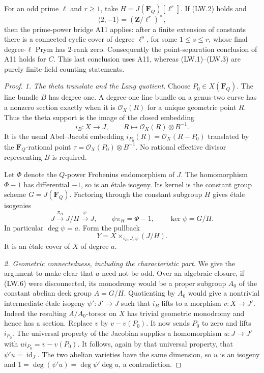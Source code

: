 \documentclass[11pt,a4paper]{article}
\begin{document}
For an odd prime $\ell$ and $r\ge1$, take
$H=J(\mathbf F_Q)[\ell^r]$.  If (LW.2) holds and
\[
             \langle 2,-1\rangle=(\mathbf Z/\ell^r)^\times,
 \tag{LW.4}
\]
then the prime-power bridge A11 applies: after a finite extension of
constants there is a connected cyclic cover of degree $\ell^s$,
for some $1\le s\le r$, whose final degree-$\ell$ Prym has $2$-rank zero.
Consequently the point-separation conclusion of A11 holds for $C$.
This last conclusion uses A11, whereas (LW.1)--(LW.3) are purely
finite-field counting statements.

\begin{proof}
\emph{1. The theta translate and the Lang quotient.}
Choose $P_0\in X(\mathbf F_Q)$.  The line bundle $B$ has degree one.
A degree-one line bundle on a genus-two curve has a nonzero section
exactly when it is $\mathcal O_X(R)$ for a unique geometric point $R$.
Thus the theta support is the image of the closed embedding
\[
 i_B:X\longrightarrow J,\qquad
 R\longmapsto\mathcal O_X(R)\otimes B^{-1}.
\]
It is the usual Abel--Jacobi embedding
$i_{P_0}(R)=\mathcal O_X(R-P_0)$ translated by the
$\mathbf F_Q$-rational point
$\tau=\mathcal O_X(P_0)\otimes B^{-1}$.
No rational effective divisor representing $B$ is required.

Let $\Phi$ denote the $Q$-power Frobenius endomorphism of $J$.
The homomorphism $\Phi-1$ has differential $-1$, so is an
\'etale isogeny.  Its kernel is the constant group scheme
$G=J(\mathbf F_Q)$.  Factoring through the constant subgroup $H$
gives \'etale isogenies
\[
  J\xrightarrow{\pi_H} J/H\xrightarrow{\psi}J,
  \qquad \psi\pi_H=\Phi-1,
  \qquad \ker\psi=G/H.
 \tag{LW.5}
\]
In particular $\deg\psi=a$.  Form the pullback
\[
                  Y=X\times_{i_B,J,\psi}(J/H).
 \tag{LW.6}
\]
It is an \'etale cover of $X$ of degree $a$.

\emph{2. Geometric connectedness, including the characteristic part.}
We give the argument to make clear that $a$ need not be odd.
Over an algebraic closure, if (LW.6) were disconnected, its
monodromy would be a proper subgroup $A_0$ of the constant abelian
deck group $A=G/H$.  Quotienting by $A_0$ would give a nontrivial
intermediate \'etale isogeny
$\psi':J'\to J$ such that $i_B$ lifts to a morphism $v:X\to J'$.
Indeed the resulting $A/A_0$-torsor on $X$ has trivial geometric
monodromy and hence has a section.
Replace $v$ by $v-v(P_0)$.  It now sends $P_0$ to zero and lifts
$i_{P_0}$.  The universal property of the Jacobian supplies a
homomorphism $u:J\to J'$ with
$u i_{P_0}=v-v(P_0)$.  It follows, again by that universal property,
that $\psi'u=\operatorname{id}_J$.  The two abelian varieties have
the same dimension, so $u$ is an isogeny and
$1=\deg(\psi'u)=\deg\psi'\deg u$, a contradiction.


\end{proof}
\end{document}
